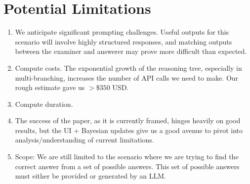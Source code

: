 \documentclass{article} %
\begin{document}
\section{Potential Limitations}

\begin{enumerate}
    \item We anticipate significant prompting challenges. Useful outputs for this scenario will involve highly structured responses, and matching outputs between the examiner and answerer may prove more difficult than expected.
    \item Compute costs. The exponential growth of the reasoning tree, especially in multi-branching, increases the number of API calls we need to make. Our rough estimate gave us $>\$350$ USD.
    \item Compute duration.
    \item The success of the paper, as it is currently framed, hinges heavily on good results, but the UI + Bayesian updates give us a good avenue to pivot into analysis/understanding of current limitations.
    \item Scope: We are still limited to the scenario where we are trying to find the correct answer from a set of possible answers. This set of possible answers must either be provided or generated by an LLM.
\end{enumerate}




\end{document}

